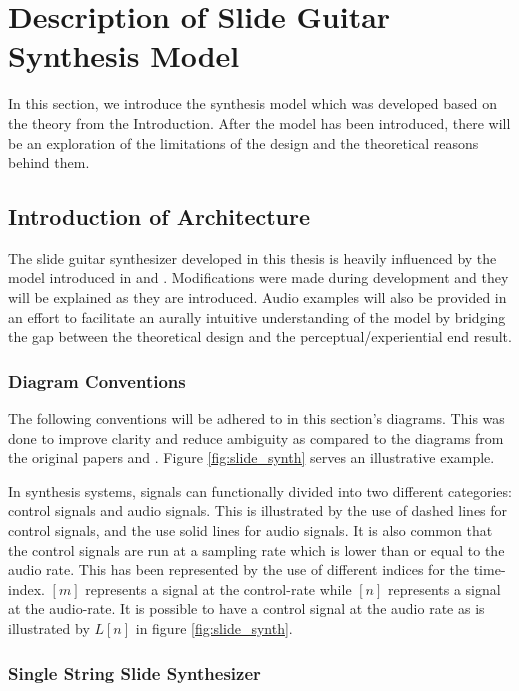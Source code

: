 \documentclass[../main.tex]{subfiles}
\begin{document}
\chapter{Description of Slide Guitar Synthesis Model}
In this section, we introduce the synthesis model which was developed based on the theory from the Introduction. After the model has been introduced, there will be an exploration of the limitations of the design and the theoretical reasons behind them.

\section{Introduction of Architecture}
The slide guitar synthesizer developed in this thesis is heavily influenced by the model introduced in  and . Modifications were made during development and they will be explained as they are introduced. Audio examples will also be provided in an effort to facilitate an aurally intuitive understanding of the model by bridging the gap between the theoretical design and the perceptual/experiential end result.

\subsection{Diagram Conventions}
The following conventions will be adhered to in this section's diagrams. This was done to improve clarity and reduce ambiguity as compared to the diagrams from the original papers  and . Figure \ref{fig:slide_synth} serves an illustrative example.

In synthesis systems, signals can functionally divided into two different categories: control signals and audio signals. This is illustrated by the use of dashed lines for control signals, and the use solid lines for audio signals. It is also common that the control signals are run at a sampling rate which is lower than or equal to the audio rate. This has been represented by the use of different indices for the time-index. $[m]$ represents a signal at the control-rate while $[n]$ represents a signal at the audio-rate. It is possible to have a control signal at the audio rate as is illustrated by $L[n]$ in figure \ref{fig:slide_synth}.

\subsection{Single String Slide Synthesizer}
\end{document}
